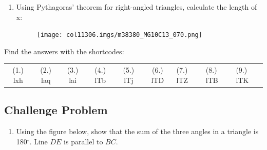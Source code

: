 \begin{table}[H]
\begin{enumerate}[noitemsep,
label=\textbf{\arabic*}. ]
 \pagebreak       
\label{m38380*uid144}\item Using Pythagoras' theorem for right-angled triangles,
calculate the length of x:

          
    \setcounter{subfigure}{0}


	\begin{figure}[H] %
    \begin{center}
   
\label{m38380*id401236!!!underscore!!!media}\label{
m38380*id401236!!!underscore!!!printimage}\texttt{[image: 
col11306.imgs/m38380\_MG10C13\_070.png]} %
        
      \vspace{2pt}
    \vspace{.1in}
    
    \end{center}

 \end{figure}   

    \addtocounter{footnote}{-0}
    
        
\end{enumerate}
        
      \label{m38380*uid132}
\par {} Find the
answers with the shortcodes:
 \par \begin{tabular}[h]{cccccc}
 (1.) lxh  &  (2.) laq  &  (3.) lai  &  (4.) lTb  &  (5.) lTj  &  (6.) lTD  & 
(7.) lTZ  &  (8.) lTB  &  (9.) lTK  & \end{tabular}

\pagebreak

        \subsection{ Challenge Problem}
        \nopagebreak
        
        
        \label{m38380*id320611}\begin{enumerate}[noitemsep,
label=\textbf{\arabic*}. ] 
            \label{m38380*uid133}\item Using the figure below, show that the sum
of the three angles in a triangle is 180\begin{math}{}^{\circ }\end{math}. Line
\begin{math}DE\end{math}\hspace{1ex} is parallel to \begin{math}BC\end{math}.


\end{enumerate}
\end{table}
